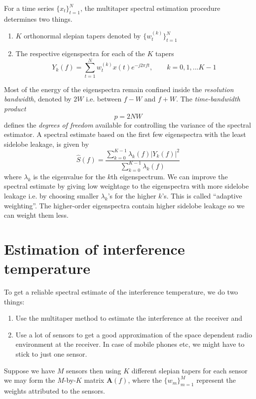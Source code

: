 \documentclass[12pt]{article}
\begin{document}
For a time series $\{x_t\}_{t=1}^N$, the multitaper spectral estimation procedure determines two things.
\begin{enumerate}
    \item $K$ orthonormal slepian tapers denoted by $\{w_t^{(k)}\}_{t=1}^{N}$
    \item The respective eigenspectra for each of the $K$ tapers
\begin{equation}
   Y_k(f) = \sum_{t=1}^N w_t^{(k)} x(t) e^{-j2\pi{}ft}, \qquad k = 0, 1, ...K-1
\end{equation}
\end{enumerate}

Most of the energy of the eigenspectra remain confined inside the \emph{resolution bandwidth}, denoted by $2W$ i.e. between $f-W$ and $f+W$. The \emph{time-bandwidth product}
\begin{equation}
    p = 2NW
\end{equation}
defines the \emph{degrees of freedom} available for controlling the variance of the spectral estimator.
A spectral estimate based on the first few eigenspectra with the least sidelobe leakage, is given by
\begin{equation}
    \hat{S}(f) = \frac{\sum_{k=0}^{K-1} \lambda_k(f) |Y_k(f)|^2}{\sum_{k=0}^{K-1} \lambda_k(f)}
\end{equation}
where $\lambda_k$ is the eigenvalue for the $k$th eigenspectrum. We can improve the spectral estimate by giving low weightage to the eigenspectra with more sidelobe leakage i.e. by choosing smaller $\lambda_k$'s for the higher $k$'s. This is called ``adaptive weighting''. The higher-order eigenspectra contain higher sidelobe leakage so we can weight them less.

\section{Estimation of interference temperature}
To get a reliable spectral estimate of the interference temperature, we do two things:
\begin{enumerate}
    \item Use the multitaper method to estimate the interference at the receiver and
    \item Use a lot of sensors to get a good approximation of the space dependent radio environment at the receiver. In case of mobile phones etc, we might have to stick to just one sensor.
\end{enumerate}


Suppose we have $M$ sensors then using $K$ different slepian tapers for each sensor we may form the $M$-by-$K$ matrix $\mathbf{A}(f)$, where the $\{w_m\}_{m=1}^M$ represent the weights attributed to the sensors.
\end{document}
